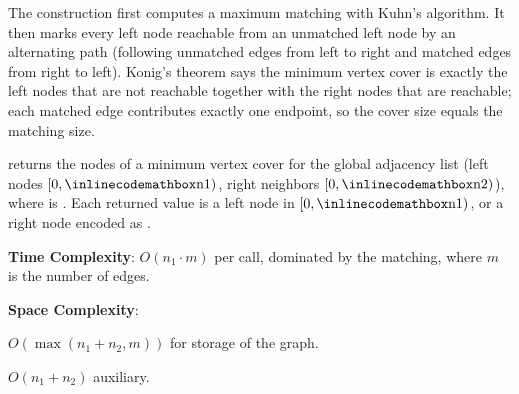 The construction first computes a maximum matching with Kuhn's algorithm. It then marks every left node reachable from an unmatched left node by an alternating path (following unmatched edges from left to right and matched edges from right to left). Konig's theorem says the minimum vertex cover is exactly the left nodes that are not reachable together with the right nodes that are reachable; each matched edge contributes exactly one endpoint, so the cover size equals the matching size.

\begin{compactitem}
  \item {} returns the nodes of a minimum vertex cover for the global adjacency list  (left nodes $[0, {\inlinecodemath{n1}})$, right neighbors $[0, {\inlinecodemath{n2}})$), where  is . Each returned value is a left node  in $[0, {\inlinecodemath{n1}})$, or a right node  encoded as .
\end{compactitem}

\textbf{Time Complexity}: $O(n_1 \cdot m)$ per call, dominated by the matching, where $m$ is the number of edges.

\textbf{Space Complexity}:
\begin{compactitem}
  \item $O(\max\left(n_1 + n_2, m\right))$ for storage of the graph.
  \item $O(n_1 + n_2)$ auxiliary.
\end{compactitem}

